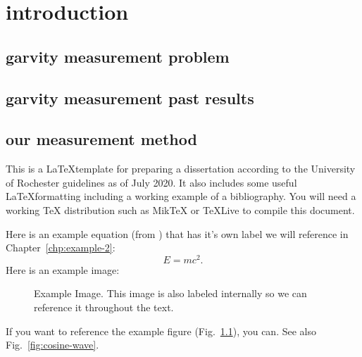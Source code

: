 \documentclass[\main/master.tex]{subfiles}
\begin{document}
\chapter{introduction}\label{chp:example-1}
\section{garvity measurement problem}
\section{garvity measurement past results}
\section{our measurement method}

\doublespacing
\hspace{5 mm} This is a \LaTeX template for preparing a dissertation according to the University of Rochester guidelines \cite{uofr_guidelines} as of July 2020. It also includes some useful \LaTeX formatting including a working example of a bibliography. You will need a working TeX distribution such as MikTeX \cite{miktex_home} or TeXLive \cite{texlive_nodate} to compile this document.  \par
Here is an example equation (from \cite{einstein1905tragheit}) that has it's own label we will reference in Chapter~\ref{chp:example-2}:
\begin{equation}
E=mc^{2}.\label{eqn:energy-mass-equivalence-relation}
\end{equation}
Here is an example image:
\begin{figure}[htbp]
	\centering
	\caption[Example Image]{Example Image. This image is also labeled internally so we can reference it throughout the text.}
	\label{fig:sine-wave}
\end{figure}
If you want to reference the example figure (Fig.~\ref{fig:sine-wave}), you can. See also Fig.~\ref{fig:cosine-wave}.
\end{document}
